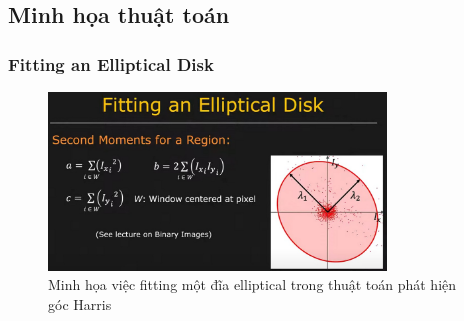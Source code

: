 \documentclass[12pt]{article}
\begin{document}
\subsection{Minh họa thuật toán}

\subsubsection{Fitting an Elliptical Disk}
\begin{figure}[htbp]
    \centering
    \includegraphics[width=0.8\textwidth]{img/fitting_an_elliptical_disk.jpg}
    \caption{Minh họa việc fitting một đĩa elliptical trong thuật toán phát hiện góc Harris \cite{harris_youtube}}
    \label{fig:elliptical_disk}
\end{figure}
\end{document}
